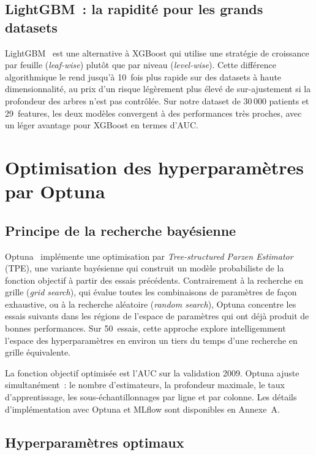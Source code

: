 \subsection{LightGBM~: la rapidité pour les grands datasets}

LightGBM~\cite{ke2017lightgbm} est une alternative à XGBoost qui utilise une
stratégie de croissance par feuille (\textit{leaf-wise}) plutôt que par niveau
(\textit{level-wise}). Cette différence algorithmique le rend jusqu'à 10~fois plus
rapide sur des datasets à haute dimensionnalité, au prix d'un risque légèrement
plus élevé de sur-ajustement si la profondeur des arbres n'est pas contrôlée.
Sur notre dataset de 30\,000 patients et 29~features, les deux modèles convergent
à des performances très proches, avec un léger avantage pour XGBoost en termes d'AUC.

\section{Optimisation des hyperparamètres par Optuna}

\subsection{Principe de la recherche bayésienne}

Optuna~\cite{akiba2019optuna} implémente une optimisation par \textit{Tree-structured
Parzen Estimator} (TPE), une variante bayésienne qui construit un modèle probabiliste
de la fonction objectif à partir des essais précédents. Contrairement à la recherche
en grille (\textit{grid search}), qui évalue toutes les combinaisons de paramètres
de façon exhaustive, ou à la recherche aléatoire (\textit{random search}), Optuna
concentre les essais suivants dans les régions de l'espace de paramètres qui ont
déjà produit de bonnes performances. Sur 50~essais, cette approche explore intelligemment
l'espace des hyperparamètres en environ un tiers du temps d'une recherche en grille
équivalente.

La fonction objectif optimisée est l'AUC sur la validation 2009. Optuna ajuste
simultanément~: le nombre d'estimateurs, la profondeur maximale, le taux d'apprentissage,
les sous-échantillonnages par ligne et par colonne. Les détails d'implémentation avec
Optuna et MLflow sont disponibles en Annexe~A.

\subsection{Hyperparamètres optimaux}

